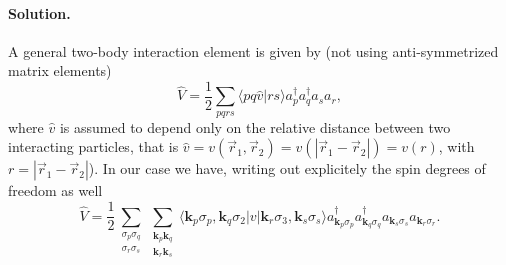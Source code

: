 \documentclass[%
oneside,                 %
final,                   %
10pt]{article}
\newenvironment{doconceexercise}{}{}
\begin{document}
\begin{doconceexercise}
\paragraph{Solution.}
A general two-body interaction element is given by (not using anti-symmetrized matrix elements)
\[ 
\hat{V} = \frac{1}{2} \sum_{pqrs} \langle pq \hat{v} \vert rs\rangle a_p^\dagger a_q^\dagger a_s a_r ,  
\]
where $\hat{v}$ is assumed to depend only on the relative distance between two interacting particles, that is
$\hat{v} = v(\vec r_1, \vec r_2) = v(|\vec r_1 - \vec r_2|) = v(r)$, with $r = |\vec r_1 - \vec r_2|$). 
In our case we have, writing out explicitely the spin degrees of freedom as well
\begin{equation}
\hat{V} = \frac{1}{2} \sum_{\substack{\sigma_p \sigma_q \\ \sigma_r \sigma_s}}
\sum_{\substack{\mathbf{k}_p \mathbf{k}_q \\ \mathbf{k}_r \mathbf{k}_s}}
\langle \mathbf{k}_p \sigma_p, \mathbf{k}_q \sigma_2\vert v \vert \mathbf{k}_r \sigma_3, \mathbf{k}_s \sigma_s\rangle
a_{\mathbf{k}_p \sigma_p}^\dagger a_{\mathbf{k}_q \sigma_q}^\dagger a_{\mathbf{k}_s \sigma_s} a_{\mathbf{k}_r \sigma_r} .
\label{eq:V_original}
\end{equation}


\end{doconceexercise}
\end{document}
